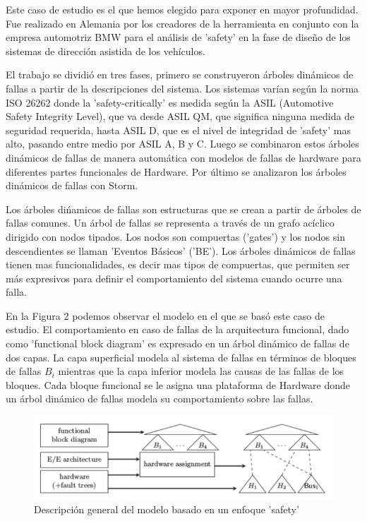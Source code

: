 \documentclass[11pt]{article}
\begin{document}
Este caso de estudio es el que hemos elegido para exponer en mayor profundidad. Fue realizado en Alemania por los creadores de la herramienta en conjunto con la empresa automotriz BMW para el an\'alisis de 'safety' en la fase de dise\~no de los sistemas de direcci\'on asistida de los veh\'iculos.

El trabajo se dividi\'o en tres fases, primero se construyeron \'arboles din\'amicos de fallas a partir de la descripciones del sistema. Los sistemas var\'ian seg\'un la norma ISO 26262 donde la 'safety-critically' es medida seg\'un la ASIL (Automotive Safety Integrity Level), que va desde ASIL QM, que significa ninguna medida de seguridad requerida, hasta ASIL D, que es el nivel de integridad de 'safety' mas alto, pasando entre medio por ASIL A, B y C. Luego se combinaron estos \'arboles din\'amicos de fallas de manera autom\'atica con modelos de fallas de hardware para diferentes partes funcionales de Hardware. Por \'ultimo se analizaron los \'arboles din\'amicos de fallas con Storm.

Los \'arboles di\'namicos de fallas son estructuras que se crean a partir de \'arboles de fallas comunes. Un \'arbol de fallas se representa a trav\'es de un grafo ac\'iclico dirigido con nodos tipados. Los nodos son compuertas ('gates') y los nodos sin descendientes se llaman 'Eventos B\'asicos' ('BE'). Los \'arboles din\'amicos de fallas tienen mas funcionalidades, es decir mas tipos de compuertas, que permiten ser m\'as expresivos para definir el comportamiento del sistema cuando ocurre una falla.

En la Figura 2 podemos observar el modelo en el que se bas\'o este caso de estudio. El comportamiento en caso de fallas de la arquitectura funcional, dado como 'functional block diagram' es expresado en un \'arbol din\'amico de fallas de dos capas. La capa superficial modela al sistema de fallas en t\'erminos de bloques de fallas $B_i$ mientras que la capa inferior modela las causas de las fallas de los bloques. Cada bloque funcional se le asigna una plataforma de Hardware donde un \'arbol din\'amico de fallas modela su comportamiento sobre las fallas.

\begin{figure}[h]
	\includegraphics[scale=0.43]{modelbased.png} 
	\centering
	\caption{Descripci\'on general del modelo basado en un enfoque 'safety'}%
\end{figure}
\end{document}
